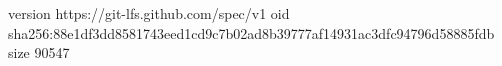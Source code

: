 version https://git-lfs.github.com/spec/v1
oid sha256:88e1df3dd8581743eed1cd9c7b02ad8b39777af14931ac3dfc94796d58885fdb
size 90547
